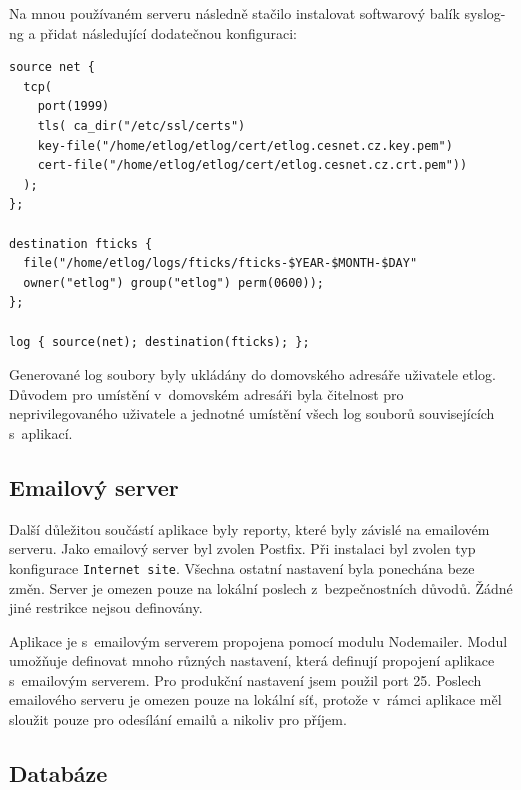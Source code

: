 \documentclass[thesis=M,czech]{FITthesis}[2012/06/26]
\begin{document}
      Na mnou používaném serveru následně stačilo instalovat
      softwarový balík syslog-ng a přidat následující dodatečnou konfiguraci:
      
      \begin{verbatim}
source net {
  tcp(
    port(1999)
    tls( ca_dir("/etc/ssl/certs")
    key-file("/home/etlog/etlog/cert/etlog.cesnet.cz.key.pem")
    cert-file("/home/etlog/etlog/cert/etlog.cesnet.cz.crt.pem"))
  );
};

destination fticks { 
  file("/home/etlog/logs/fticks/fticks-$YEAR-$MONTH-$DAY" 
  owner("etlog") group("etlog") perm(0600)); 
};

log { source(net); destination(fticks); };
      \end{verbatim}

      Generované log soubory byly ukládány do domovského adresáře
      uživatele etlog.
      Důvodem pro umístění v~domovském adresáři byla čitelnost pro neprivilegovaného uživatele a
      jednotné umístění všech log souborů souvisejících s~aplikací.

    \subsection{Emailový server}

      Další důležitou součástí aplikace byly reporty, které byly závislé na emailovém serveru.
      Jako emailový server byl zvolen Postfix.
      Při instalaci byl zvolen typ konfigurace \verb|Internet site|.
      Všechna ostatní nastavení byla ponechána beze změn.
      Server je omezen pouze na lokální poslech z~bezpečnostních důvodů.
      Žádné jiné restrikce nejsou definovány.

      Aplikace je s~emailovým serverem propojena pomocí modulu Nodemailer.
      Modul umožňuje definovat mnoho různých nastavení, která definují propojení
      aplikace s~emailovým serverem.
      Pro produkční nastavení jsem použil port 25. 
      Poslech emailového serveru je omezen pouze na lokální síť,
      protože v~rámci aplikace měl sloužit pouze pro odesílání emailů a nikoliv pro příjem.


    \subsection{Databáze}
\end{document}
